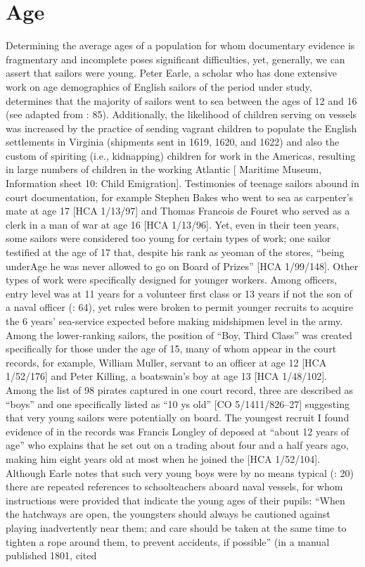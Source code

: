 \section{{Age}}\label{sec:3.4}

  Determining the average ages of a population for whom documentary evidence is fragmentary and incomplete poses significant difficulties, yet, generally, we can assert that sailors were young. Peter Earle, a scholar who has done extensive work on age demographics of English sailors of the period under study, determines that the majority of sailors went to sea between the ages of 12 and 16 (see   adapted from \citealt{Earle1993}: 85). Additionally, the likelihood of children serving on vessels was increased by the practice of sending vagrant children to populate the English settlements in Virginia (shipments sent in 1619, 1620, and 1622) and also the custom of spiriting (i.e., kidnapping) children for work in the Americas, resulting in large numbers of children in the working Atlantic [ Maritime Museum, Information sheet 10: Child Emigration]. Testimonies of teenage sailors abound in court documentation, for example Stephen Bakes who went to sea as carpenter’s mate at age 17 [HCA 1/13/97] and Thomas Francois de Fouret who served as a clerk in a man of war at age 16 [HCA 1/13/96]. Yet, even in their teen years, some sailors were considered too young for certain types of work; one sailor testified at the age of 17 that, despite his rank as yeoman of the stores, “being underAge he was never allowed to go on Board of Prizes” [HCA 1/99/148]. Other types of work were specifically designed for younger workers. Among officers, entry level was at 11 years for a volunteer first class or 13 years if not the son of a naval officer (\citealt{AdkinsAdkins2008}: 64), yet rules were broken to permit younger recruits to acquire the 6 years’ sea-service expected before making midshipmen level in the army. Among the lower-ranking sailors, the position of “Boy, Third Class” was created specifically for those under the age of 15, many of whom appear in the court records, for example, William Muller, servant to an officer at age 12 [HCA 1/52/176] and Peter Killing, a boatswain's boy at age 13 [HCA 1/48/102]. Among the list of 98 pirates captured in one court record, three are described as “boys” and one specifically listed as “10 ys old” [CO 5/1411/826–27] suggesting that very young sailors were potentially on board. The youngest recruit I found evidence of in the records was Francis Longley of  deposed at “about 12 years of age” who explains that he set out on a trading  about four and a half years ago, making him eight years old at most when he joined the  [HCA 1/52/104]. Although Earle notes that such very young boys were by no means typical (\citealt{Earle1998}: 20) there are repeated references to schoolteachers aboard naval vessels, for whom instructions were provided that indicate the young ages of their pupils: “When the hatchways are open, the youngsters should always be cautioned against playing inadvertently near them; and care should be taken at the same time to tighten a rope around them, to prevent accidents, if possible” (in a manual published 1801, cited 